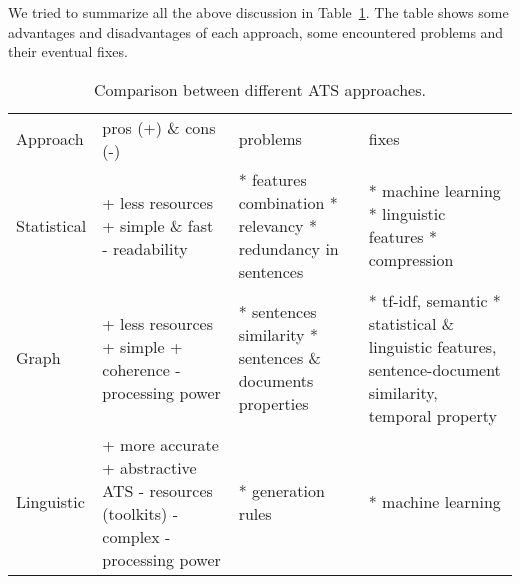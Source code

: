 We tried to summarize all the above discussion in Table~\ref{tab:app-comp}.
The table shows some advantages and disadvantages of each approach, some encountered problems and their eventual fixes.
\begin{table}[ht]
	\caption{Comparison between different ATS approaches.\label{tab:app-comp}}
	\begin{tabular}{p{}p{}p{}p{}}
		\hline\hline\noalign{\smallskip}
		
		Approach & pros (+) \& cons (-) & problems & fixes \\
		\noalign{\smallskip}\hline\noalign{\smallskip}
		
		Statistical 
		& 
		+ less resources \newline 
		+ simple \& fast \newline
		- readability
		& 
		* features combination \newline
		* relevancy \newline 
		* redundancy in sentences
		& 
		* machine learning \newline
		* linguistic features \newline 
		* compression
		\\
		
		\hline\noalign{\smallskip}
		
		Graph 
		& 
		+ less resources \newline 
		+ simple \newline
		+ coherence \newline
		- processing power
		& 
		* sentences similarity \newline 
		* sentences \& documents properties
		& 
		* tf-idf, semantic \newline 
		* statistical \& linguistic features, sentence-document similarity, temporal property
		\\
		
		\hline\noalign{\smallskip}
		
		Linguistic 
		& 
		+ more accurate  \newline 
		+ abstractive ATS  \newline 
		- resources (toolkits) \newline 
		- complex \newline
		- processing power
		& 
		* generation rules
		&
		* machine learning 
		\\
		

\end{tabular}
\end{table}
